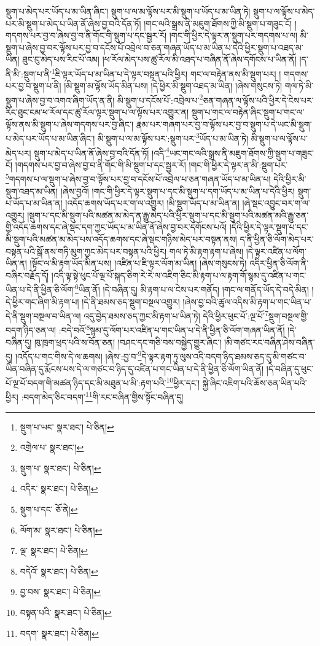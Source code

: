 སྡུག་པ་མེད་པར་ཡོད་པ་མ་ཡིན་ཞིང་། སྡུག་པ་ལ་མ་ལྟོས་པར་མི་སྡུག་པ་ཡོད་པ་མ་ཡིན་ཏེ། སྡུག་པ་ལ་ལྟོས་པ་མེད་པར་མི་སྡུག་པ་མེད་པ་ཡིན་ནོ་ཞེས་བྱ་བའི་དོན་ཏོ། །གང་ལའི་སྒྲས་ནི་མཇུག་ཐོགས་ཀྱི་མི་སྡུག་པ་གཟུང་ངོ། །གདགས་པར་བྱ་བ་ཞེས་བྱ་བ་ནི་གོང་གི་སྡུག་པ་དང་སྦྱར་རོ། །གང་གི་ཕྱིར་དེ་ལྟར་ན་སྡུག་པར་གདགས་པ་ལ། མི་སྡུག་པ་ཞེས་བྱ་བར་ལྟོས་པར་བྱ་བ་དངོས་པོ་འབྲེལ་བ་ཅན་གཞན་ཡོད་པ་མ་ཡིན་པ་དེའི་ཕྱིར་སྡུག་པ་འཐད་མ་ཡིན། ཐུང་ངུ་མེད་པས་རིང་པོ་འམ། །ཕ་རོལ་མེད་པས་ཚུ་རོལ་མི་འཐད་པ་བཞིན་ནོ་ཞེས་དགོངས་པ་ཡིན་ནོ། །ད་ནི་མི་:སྡུག་པ་ནི་\footnote{སྡུག་པ་ཡང་  སྣར་ཐང་།  པེ་ཅིན། }ཇི་ལྟར་ཡོད་པ་མ་ཡིན་པ་དེ་ལྟར་བསྟན་པའི་ཕྱིར། གང་ལ་བརྟེན་ནས་མི་སྡུག་པར། །
གདགས་པར་བྱ་བ་སྡུག་པ་ནི། །མི་སྡུག་མ་ལྟོས་ཡོད་མིན་པས། །དེ་ཕྱིར་མི་སྡུག་འཐད་མ་ཡིན། །ཞེས་གསུངས་ཏེ། གལ་ཏེ་མི་སྡུག་པ་ཞེས་བྱ་བ་འགའ་ཞིག་ཡོད་ན་ནི། མི་སྡུག་པ་དངོས་པོ་:འབྲེལ་པ་\footnote{འགྲེལ་པ་  སྣར་ཐང་། }ཅན་གཞན་ལ་ལྟོས་པའི་ཕྱིར་དེ་ངེས་པར་རིང་ཐུང་ངམ་ཕ་རོལ་དང་ཚུ་རོལ་ལྟར་སྡུག་པ་ལ་ལྟོས་པར་འགྱུར་ན། སྡུག་པ་གང་ལ་བརྟེན་ཞིང་སྡུག་པ་གང་ལ་ལྟོས་ནས་མི་སྡུག་པ་ཞེས་གདགས་པར་བྱ་ཞིང་། རྣམ་པར་གཞག་པར་བྱ་བ་ལྟོས་པར་བྱ་བ་སྡུག་པ་དེ་ཡང་མི་སྡུག་པ་མེད་པར་ཡོད་པ་མ་ཡིན་ཞིང་། མི་སྡུག་པ་ལ་མ་ལྟོས་པར་:སྡུག་པར་\footnote{སྡུག་པ་  སྣར་ཐང་།  པེ་ཅིན། }ཡོད་པ་མ་ཡིན་ཏེ། མི་སྡུག་པ་ལ་ལྟོས་པ་མེད་པར། སྡུག་པ་མེད་པ་ཡིན་ནོ་ཞེས་བྱ་བའི་དོན་ཏོ། །འདི་\footnote{འདིར་  སྣར་ཐང་།  པེ་ཅིན། }ཡང་གང་ལའི་སྒྲས་ནི་མཇུག་ཐོགས་ཀྱི་སྡུག་པ་གཟུང་ངོ། །གདགས་པར་བྱ་བ་ཞེས་བྱ་བ་ནི་གོང་གི་མི་སྡུག་པ་དང་སྦྱར་རོ། །གང་གི་ཕྱིར་དེ་ལྟར་ན་མི་:སྡུག་པར་\footnote{སྡུག་པ་དང་  ཅོ་ནེ། }གདགས་པ་ལ་སྡུག་པ་ཞེས་བྱ་བ་ལྟོས་པར་བྱ་བ་དངོས་པོ་འབྲེལ་པ་ཅན་གཞན་ཡོད་པ་མ་ཡིན་པ། དེའི་ཕྱིར་མི་སྡུག་འཐད་མ་ཡིན། །ཞེས་བྱའོ། །གང་གི་ཕྱིར་དེ་ལྟར་སྡུག་པ་དང་མི་སྡུག་པ་དག་ཡོད་པ་མ་ཡིན་པ་དེའི་ཕྱིར། སྡུག་པ་ཡོད་པ་མ་ཡིན་ན། །འདོད་ཆགས་ཡོད་པར་ག་ལ་འགྱུར། །མི་སྡུག་ཡོད་པ་མ་ཡིན་ན། །ཞེ་སྡང་འབྱུང་བར་ག་ལ་འགྱུར། །སྡུག་པ་དང་མི་སྡུག་པའི་མཚན་མ་མེད་ན་རྒྱུ་མེད་པའི་ཕྱིར་སྡུག་པ་དང་མི་སྡུག་པའི་མཚན་མའི་རྒྱུ་ཅན་གྱི་འདོད་ཆགས་དང་ཞེ་སྡང་དག་ཀྱང་ཡོད་པ་མ་ཡིན་ནོ་ཞེས་བྱ་བར་དགོངས་པའོ། །དེའི་ཕྱིར་དེ་ལྟར་སྡུག་པ་དང་མི་སྡུག་པའི་མཚན་མ་མེད་པས་འདོད་ཆགས་དང་ཞེ་སྡང་གཉིས་མེད་པར་བསྟན་ནས། ད་ནི་ཕྱིན་ཅི་ལོག་མེད་པར་བསྟན་པའི་སྒོ་ནས་གཏི་མུག་ཀྱང་མེད་པར་བསྟན་པའི་ཕྱིར། གལ་ཏེ་མི་རྟག་རྟག་པ་ཞེས། །དེ་ལྟར་འཛིན་པ་ལོག་ཡིན་ན། །སྟོང་ལ་མི་རྟག་ཡོད་མིན་པས། །འཛིན་པ་ཇི་ལྟར་ལོག་མ་ཡིན། །ཞེས་གསུངས་ཏེ། འདིར་ཕྱིན་ཅི་ལོག་ནི་བཞིར་བརྗོད་དོ། །འདི་ལྟ་སྟེ་ཕུང་པོ་ལྔ་པོ་སྐད་ཅིག་རེ་རེ་ལ་འཇིག་ཅིང་མི་རྟག་པ་ལ་རྟག་གོ་སྙམ་དུ་འཛིན་པ་གང་ཡིན་པ་དེ་ནི་ཕྱིན་ཅི་ལོག་\footnote{ལོག་མ་  སྣར་ཐང་།  པེ་ཅིན། }ཡིན་ནོ། །དེ་བཞིན་དུ། མི་རྟག་པ་ལ་ངེས་པར་གནོད། །གང་ལ་གནོད་ཡོད་དེ་བདེ་མིན། །དེ་ཕྱིར་གང་ཞིག་མི་རྟག་པ། །དེ་ནི་ཐམས་ཅད་སྡུག་བསྔལ་འགྱུར། །ཞེས་བྱ་བའི་ཚུལ་འདིས་མི་རྟག་པ་གང་ཡིན་པ་དེ་ནི་སྡུག་བསྔལ་བ་ཡིན་ལ། འདུ་བྱེད་ཐམས་ཅད་ཀྱང་མི་རྟག་པ་ཡིན་ཏེ། དེའི་ཕྱིར་ཕུང་པོ་:ལྔ་པོ་\footnote{ལྔ་  སྣར་ཐང་།  པེ་ཅིན། }སྡུག་བསྔལ་གྱི་བདག་ཉིད་ཅན་ལ། :བདེ་བའོ་\footnote{བདེའོ་  སྣར་ཐང་།  པེ་ཅིན། }སྙམ་དུ་ལོག་པར་འཛིན་པ་གང་ཡིན་པ་དེ་ནི་ཕྱིན་ཅི་ལོག་གཞན་ཡིན་ནོ། །དེ་བཞིན་དུ། ཁུ་ཁྲག་ཕྲད་པའི་ས་བོན་ཅན། །བཤང་དང་གཅི་བས་བསྐྱེད་གྱུར་ཞིང་། །མི་གཙང་རང་བཞིན་ཤེས་བཞིན་དུ། །འདོད་པ་གང་གིས་དེ་ལ་ཆགས། །ཞེས་:བྱ་བ་\footnote{བྱ་བས་  སྣར་ཐང་།  པེ་ཅིན། }དེ་ལྟར་རྟག་ཏུ་ལུས་འདི་བདག་ཉིད་ཐམས་ཅད་དུ་མི་གཙང་བ་ཡིན་བཞིན་དུ་རྨོངས་པས་དེ་ལ་གཙང་བ་ཉིད་དུ་འཛིན་པ་གང་ཡིན་པ་དེ་ནི་ཕྱིན་ཅི་ལོག་ཡིན་ནོ། །དེ་བཞིན་དུ་ཕུང་པོ་ལྔ་པོ་བདག་གི་མཚན་ཉིད་དང་མི་མཐུན་པ་མི་:རྟག་པའི་\footnote{བསྟན་པའི་  སྣར་ཐང་།  པེ་ཅིན། }ཕྱིར་དང་། སྐྱེ་ཞིང་འཇིག་པའི་ཆོས་ཅན་ཡིན་པའི་ཕྱིར། :བདག་མེད་ཅིང་བདག་\footnote{བདག་  སྣར་ཐང་།  པེ་ཅིན། }གི་རང་བཞིན་གྱིས་སྟོང་བཞིན་དུ། 